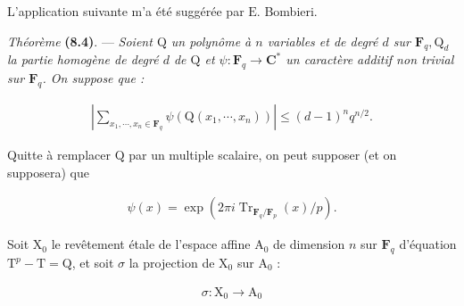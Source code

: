 \documentclass[10pt,leqno]{article}
\begin{document}
\noindent L'application suivante m'a été suggérée par \(\mathrm{E}\). Bombieri.\par

\noindent \emph{Théorème} \textbf{(8.4)}. — {\itshape Soient \(\mathrm{Q}\) un polynôme à \(n\) variables et de degré \(d\) sur \(\mathbf{F}_{q}, \mathrm{Q}_{d}\) la partie homogène de degré \(d\) de \(\mathrm{Q}\) et \(\psi  : \mathbf{F}_{q} \longrightarrow  \mathbf{C}^{*}\) un caractère additif non trivial sur \(\mathbf{F}_{q}\). On suppose que :}\par

\par

\clearpage

\label{physical-32}\par\smallskip

\par

\begin{equation*}\begin{gathered}|\sum _{x_{1},\cdots ,x_{n} \in  \mathbf{F}_{q}} \psi (\mathrm{Q}(x_{1},\cdots ,x_{n}))| \leq  (d-1)^{n} q^{n/2}.\end{gathered}\end{equation*}

\noindent Quitte à remplacer \(\mathrm{Q}\) par un multiple scalaire, on peut supposer (et on supposera) que\par

\begin{equation*}\begin{gathered}\psi (x) = \operatorname{exp}(2\pi i \operatorname{Tr}_{\mathbf{F}_{q}/\mathbf{F}_{p}}(x)/p).\end{gathered}\tag{8.4.1}\end{equation*}

\noindent Soit \(\mathrm{X}_{0}\) le revêtement étale de l'espace affine \(\mathrm{A}_{0}\) de dimension \(n\) sur \(\mathbf{F}_{q}\) d'équation \(\mathrm{T}^{p} - \mathrm{T} = \mathrm{Q}\), et soit \(\sigma \) la projection de \(\mathrm{X}_{0}\) sur \(\mathrm{A}_{0}\) :\par

\begin{equation*}\begin{gathered}\sigma  : \mathrm{X}_{0} \longrightarrow  \mathrm{A}_{0}\end{gathered}\end{equation*}
\end{document}
